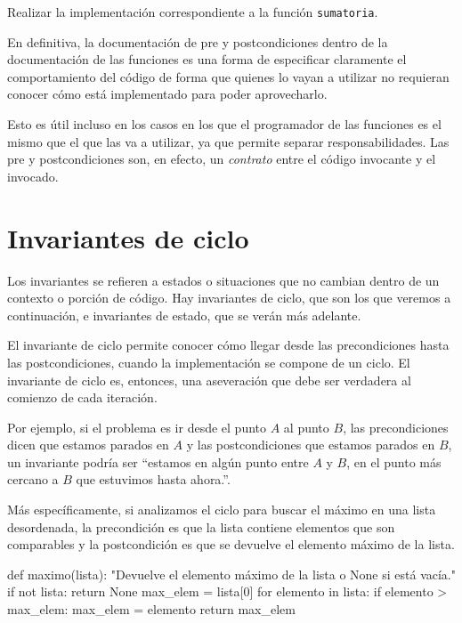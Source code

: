 \begin{ejercicio}
Realizar la implementación correspondiente a la función \lstinline!sumatoria!.
\end{ejercicio}

En definitiva, la documentación de pre y postcondiciones dentro de la documentación
de las funciones es una forma de especificar claramente el comportamiento del
código de forma que quienes lo vayan a utilizar no requieran conocer cómo está
implementado para poder aprovecharlo.

Esto es útil incluso en los casos en los que el programador de las funciones
es el mismo que el que las va a utilizar, ya que permite separar
responsabilidades. Las pre y postcondiciones son, en efecto, un
\textit{contrato} entre el código invocante y el invocado.

\section{Invariantes de ciclo}


\label{invariantes}
Los invariantes se refieren a estados o situaciones que no cambian dentro
de un contexto o porción de código.  Hay invariantes de ciclo, que son los
que veremos a continuación, e invariantes de estado, que se verán más
adelante.

El invariante de ciclo permite conocer cómo llegar desde las precondiciones
hasta las postcondiciones, cuando la implementación se compone de un ciclo.
El invariante de ciclo es, entonces, una
aseveración que debe ser verdadera al comienzo de cada iteración.

Por ejemplo, si el problema es ir desde el punto $A$ al punto $B$, las
precondiciones dicen que estamos parados en $A$ y las postcondiciones que
estamos parados en $B$, un invariante podría ser ``estamos en algún punto entre
$A$ y $B$, en el punto más cercano a $B$ que estuvimos hasta ahora.''.

Más específicamente, si analizamos el ciclo para buscar el máximo en una lista
desordenada, la precondición es que la lista contiene elementos que son
comparables y la postcondición es que se devuelve el elemento máximo de la
lista.

\begin{codigo-python-sn}
def maximo(lista):
    "Devuelve el elemento máximo de la lista o None si está vacía."
    if not lista:
        return None
    max_elem = lista[0]
    for elemento in lista:
        if elemento > max_elem:
            max_elem = elemento
    return max_elem
\end{codigo-python-sn}

